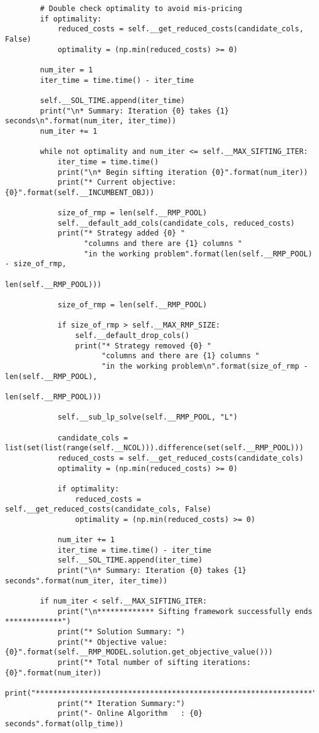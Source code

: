 \documentclass{article}
\begin{document}
\begin{lstlisting}
        # Double check optimality to avoid mis-pricing
        if optimality:
            reduced_costs = self.__get_reduced_costs(candidate_cols, False)
            optimality = (np.min(reduced_costs) >= 0)

        num_iter = 1
        iter_time = time.time() - iter_time

        self.__SOL_TIME.append(iter_time)
        print("\n* Summary: Iteration {0} takes {1} seconds\n".format(num_iter, iter_time))
        num_iter += 1

        while not optimality and num_iter <= self.__MAX_SIFTING_ITER:
            iter_time = time.time()
            print("\n* Begin sifting iteration {0}".format(num_iter))
            print("* Current objective: {0}".format(self.__INCUMBENT_OBJ))

            size_of_rmp = len(self.__RMP_POOL)
            self.__default_add_cols(candidate_cols, reduced_costs)
            print("* Strategy added {0} "
                  "columns and there are {1} columns "
                  "in the working problem".format(len(self.__RMP_POOL) - size_of_rmp,
                                                  len(self.__RMP_POOL)))

            size_of_rmp = len(self.__RMP_POOL)

            if size_of_rmp > self.__MAX_RMP_SIZE:
                self.__default_drop_cols()
                print("* Strategy removed {0} "
                      "columns and there are {1} columns "
                      "in the working problem\n".format(size_of_rmp - len(self.__RMP_POOL),
                                                        len(self.__RMP_POOL)))

            self.__sub_lp_solve(self.__RMP_POOL, "L")

            candidate_cols = list(set(list(range(self.__NCOL))).difference(set(self.__RMP_POOL)))
            reduced_costs = self.__get_reduced_costs(candidate_cols)
            optimality = (np.min(reduced_costs) >= 0)

            if optimality:
                reduced_costs = self.__get_reduced_costs(candidate_cols, False)
                optimality = (np.min(reduced_costs) >= 0)

            num_iter += 1
            iter_time = time.time() - iter_time
            self.__SOL_TIME.append(iter_time)
            print("\n* Summary: Iteration {0} takes {1} seconds".format(num_iter, iter_time))

        if num_iter < self.__MAX_SIFTING_ITER:
            print("\n************* Sifting framework successfully ends *************")
            print("* Solution Summary: ")
            print("* Objective value: {0}".format(self.__RMP_MODEL.solution.get_objective_value()))
            print("* Total number of sifting iterations: {0}".format(num_iter))
            print("***************************************************************")
            print("* Iteration Summary:")
            print("- Online Algorithm   : {0} seconds".format(ollp_time))


\end{lstlisting}
\end{document}

